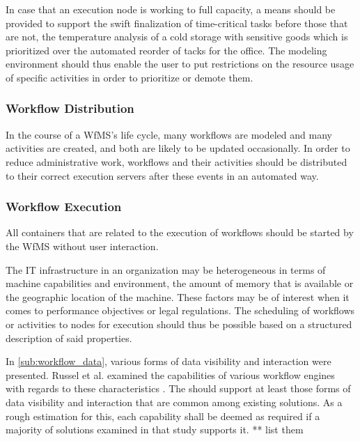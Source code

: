       In case that an execution node is working to full capacity, a means should be provided to support the swift finalization of time-critical tasks before those that are not, \eg the temperature analysis of a cold storage with sensitive goods which is prioritized over the automated reorder of tacks for the office. The modeling environment should thus enable the user to put restrictions on the resource usage of specific activities in order to prioritize or demote them.


  \subsubsection{Workflow Distribution} %
    \label{ssub:workflow_distribution}
      In the course of a \ac{WfMS}'s life cycle, many workflows are modeled and many activities are created, and both are likely to be updated occasionally. In order to reduce administrative work, workflows and their activities should be distributed to their correct execution servers after these events in an automated way.


  \subsubsection{Workflow Execution} %
    \label{ssub:workflow_execution}
        All containers that are related to the execution of workflows should be started by the \ac{WfMS} without user interaction.

        The IT infrastructure in an organization may be heterogeneous in terms of machine capabilities and environment, \eg the amount of memory that is available or the geographic location of the machine. These factors may be of interest when it comes to performance objectives or legal regulations. The scheduling of workflows or activities to nodes for execution should thus be possible based on a structured description of said properties.

        In \ref{sub:workflow_data}, various forms of data visibility and interaction were presented. Russel et al. examined the capabilities of various workflow engines with regards to these characteristics \cite{Russell2005Workflow}. The should support at least those forms of data visibility and interaction that are common among existing solutions. As a rough estimation for this, each capability shall be deemed as required if a majority of solutions examined in that study supports it.
        ** list them

